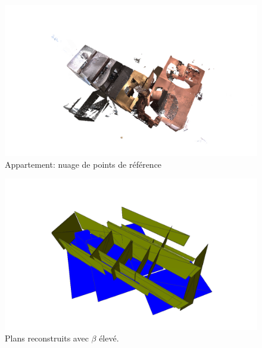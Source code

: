 \documentclass{article}
\begin{document}
\begin{multicols}{2}
\begin{figure}[H]
\centering
\includegraphics[width=1.3\columnwidth]{../appart01.png}
\caption{Appartement: nuage de points de référence}
\end{figure}

\columnbreak
\begin{figure}[H]
\centering
\includegraphics[width=1.3\columnwidth]{../appart04.png}
\caption{Plans reconstruits avec $\beta$ élevé.}
\end{figure}

\end{multicols}
\end{document}
